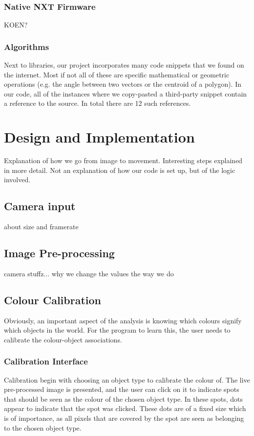 \documentclass[10pt,twocolumn]{article}
\begin{document}
\subsubsection{Native NXT Firmware}
KOEN?

\subsubsection{Algorithms}
Next to libraries, our project incorporates many code snippets that we found on the internet. Most if not all of these are specific mathematical or geometric operations (e.g. the angle between two vectors or the centroid of a polygon). In our code, all of the instances where we copy-pasted a third-party snippet contain a reference to the source. In total there are 12 such references.

\section{Design and Implementation}
Explanation of how we go from image to movement. Interesting steps explained in more detail. Not an explanation of how our code is set up, but of the logic involved.

\subsection{Camera input}
about size and framerate

\subsection{Image Pre-processing}
camera stuffz... why we change the values the way we do

\subsection{Colour Calibration}
Obviously, an important aspect of the analysis is knowing which colours signify which objects in the world. For the program to learn this, the user needs to calibrate the colour-object associations.

\subsubsection{Calibration Interface}
Calibration begin with choosing an object type to calibrate the colour of. The live pre-processed image is presented, and the user can click on it to indicate spots that should be seen as the colour of the chosen object type. In these spots, dots appear to indicate that the spot was clicked. These dots are of a fixed size which is of importance, as all pixels that are covered by the spot are seen as belonging to the chosen object type.
\end{document}
